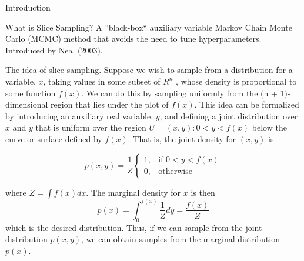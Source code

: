 \documentclass[aspectratio=169]{beamer}
\begin{document}
\begin{frame}{Introduction}

	\begin{block}{What is Slice Sampling?}
		A ''black-box`` auxiliary variable Markov Chain Monte Carlo (MCMC) method that
		avoids the need to tune hyperparameters. Introduced by Neal (2003).
	\end{block}

	The idea of slice sampling. Suppose we wish to sample from a distribution for a 
	variable, $x$, taking values in some subset of $R^n$ , whose density is proportional 
	to some function $f (x)$. We can do this by sampling uniformly from the
	(n + 1)-dimensional region that lies under the plot of $f (x)$. This idea can be 
	formalized by introducing an auxiliary real variable, $y$, and deﬁning a joint 
	distribution over $x$ and $y$ that is uniform over the region
	 $U = { (x,y):0 < y < f (x) }$ below the curve or surface deﬁned
	  by $f (x)$. That is, the joint density for $(x,y)$ is

	\begin{equation*}
	p(x,y) = \frac{1}{Z} \begin{cases}
		1, & \text{if } 0 < y < f(x) \\
		0, & \text{otherwise}
		\end{cases}
	\end{equation*}  

	where $Z = \int f(x)dx$. The marginal density for $x$ is then 
	\begin{equation*}
	p(x) = \int_0^{f(x)} \frac{1}{Z} dy = \frac{f(x)}{Z}
	\end{equation*}
	which is the desired distribution. Thus, if we can sample from the joint 
	distribution $p(x,y)$, we can obtain samples from the marginal distribution $p(x)$.


\end{frame}
\end{document}

